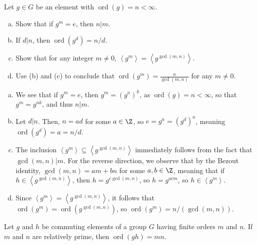 \documentclass[10pt]{mypackage}
\begin{document}
\begin{problem}[Problem 4]
  Let $g\in G$ be an element with $\operatorname{ord}\left( g \right) = n < \infty$.
  \begin{enumerate}[(a)]
    \item Show that if $g^{m} = e$, then $n | m$.
    \item If $d | n$, then $\operatorname{ord}\left( g^{d} \right) = n/d$.
    \item Show that for any integer $m\neq 0$, $\left\langle g^{m} \right\rangle = \left\langle g^{\gcd\left( m,n \right)} \right\rangle$.
    \item Use (b) and (c) to conclude that $\operatorname{ord}\left( g^{m} \right) = \frac{n}{\gcd\left( m,n \right)}$ for any $m\neq 0$.
  \end{enumerate}
\end{problem}
\begin{solution}\hfill
  \begin{enumerate}[(a)]
    \item We see that if $g^{m} = e$, then $g^{m} = \left( g^{n} \right)^{k}$, as $\operatorname{ord}\left( g \right) = n < \infty$, so that $g^{m} = g^{nk}$, and thus $n | m$.
    \item Let $d | n$. Then, $n = ad$ for some $a\in \Z$, so $e = g^{n} = \left( g^{d} \right)^{a}$, meaning $\operatorname{ord}\left( g^{d} \right) = a = n/d$.
    \item The inclusion $ \left\langle g^{m} \right\rangle \subseteq \left\langle g^{\gcd\left( m,n \right)} \right\rangle $ immediately follows from the fact that $\gcd\left( m,n \right) | m$. For the reverse direction, we observe that by the Bezout identity, $\gcd\left( m,n \right) = am + bn$ for some $a,b\in \Z$, meaning that if $h\in \left\langle g^{\gcd\left( m,n \right)} \right\rangle$, then $h = g^{c\gcd\left( m,n \right)}$, so $h = g^{acm}$, so $h\in \left\langle g^{m} \right\rangle$.
    \item Since $\left\langle g^{m} \right\rangle = \left\langle g^{\gcd\left( m,n \right)} \right\rangle$, it follows that $\operatorname{ord}\left( g^{ m } \right) = \operatorname{ord}\left( g^{\gcd\left( m,n \right)} \right)$, so $\operatorname{ord}\left( g^{m} \right) = n/\left( \gcd\left( m,n \right) \right)$.
  \end{enumerate}
\end{solution}
\begin{problem}[Problem 5]
  Let $g$ and $h$ be commuting elements of a group $G$ having finite orders $m$ and $n$. If $m$ and $n$ are relatively prime, then $ \operatorname{ord}\left( gh \right) = mn $.
\end{problem}
\end{document}
